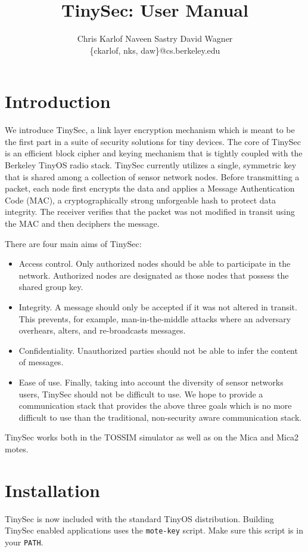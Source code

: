 \documentclass[11pt]{article}
\title{TinySec: User Manual}
\author{Chris Karlof \hspace{1cm} Naveen Sastry \hspace{1cm} David Wagner\\ \{ckarlof, nks,
  daw\}@cs.berkeley.edu}
\begin{document}
\maketitle
\section{Introduction}

We introduce TinySec, a link layer encryption mechanism which is meant to be
the first part in a suite of security solutions for tiny devices.  The core of
TinySec is an efficient block cipher and keying mechanism that is tightly
coupled with the Berkeley TinyOS radio stack.  TinySec currently utilizes a
single, symmetric key that is shared among a collection of sensor network
nodes.  Before transmitting a packet, each node first encrypts the data and
applies a Message Authentication Code (MAC), a cryptographically strong
unforgeable hash to protect data integrity.  The receiver verifies that the
packet was not modified in transit using the MAC and then deciphers the
message.

There are four main aims of TinySec:
\begin{itemize}
\item Access control. Only authorized nodes should be able to participate in
  the network.  Authorized nodes are designated as those nodes that possess
  the shared group key.
\item Integrity.  A message should only be accepted if it was not altered in
  transit. This prevents, for example, man-in-the-middle attacks where an
  adversary overhears, alters, and re-broadcasts messages.
\item Confidentiality. Unauthorized parties should not be able to infer the
  content of messages.
\item Ease of use. Finally, taking into account the diversity of sensor
  networks users, TinySec should not be difficult to use. We hope to provide a
  communication stack that provides the above three goals which is no more
  difficult to use than the traditional, non-security aware communication
  stack.
\end{itemize}

TinySec works both in the TOSSIM simulator as well as on the Mica and Mica2
motes.

\section{Installation}
TinySec is now included with the standard TinyOS distribution. 
Building TinySec enabled applications uses the {\tt mote-key} script. 
Make sure this script is in your {\tt PATH}. 
\end{document}
